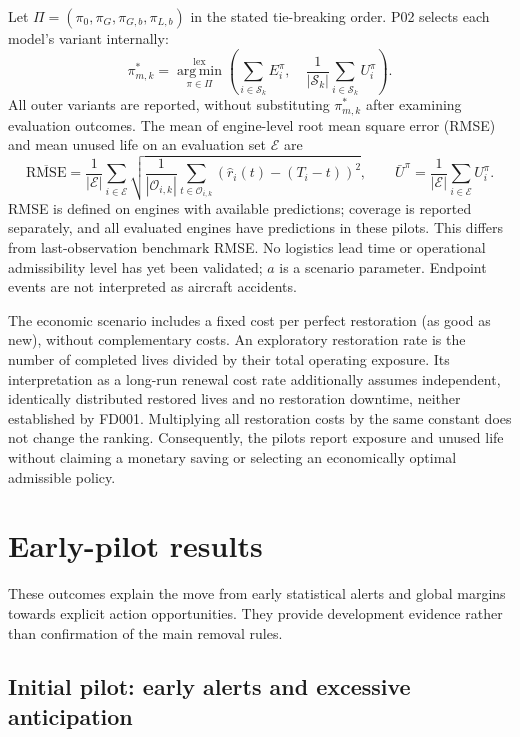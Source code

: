 \documentclass[12pt]{article}
\begin{document}
Let $\Pi=(\pi_0,\pi_G,\pi_{G,b},\pi_{L,b})$ in the stated tie-breaking order. P02 selects each model's variant internally:
\[
\pi_{m,k}^{*}=\operatorname*{arg\,min}_{\pi\in\Pi}^{\mathrm{lex}}
\left(\sum_{i\in\mathcal S_k}E_i^{\pi},\quad
\frac1{|\mathcal S_k|}\sum_{i\in\mathcal S_k}U_i^{\pi}\right).
\]
All outer variants are reported, without substituting $\pi_{m,k}^{*}$ after examining evaluation outcomes. The mean of engine-level root mean square error (RMSE) and mean unused life on an evaluation set $\mathcal E$ are
\[
\overline{\mathrm{RMSE}}=\frac1{|\mathcal E|}\sum_{i\in\mathcal E}
\sqrt{\frac1{|\mathcal O_{i,k}|}\sum_{t\in\mathcal O_{i,k}}(\widehat r_i(t)-(T_i-t))^2},
\qquad \bar U^{\pi}=\frac1{|\mathcal E|}\sum_{i\in\mathcal E}U_i^{\pi}.
\]
RMSE is defined on engines with available predictions; coverage is reported separately, and all evaluated engines have predictions in these pilots. This differs from last-observation benchmark RMSE. No logistics lead time or operational admissibility level has yet been validated; $a$ is a scenario parameter. Endpoint events are not interpreted as aircraft accidents.

The economic scenario includes a fixed cost per perfect restoration (as good as new), without complementary costs. An exploratory restoration rate is the number of completed lives divided by their total operating exposure. Its interpretation as a long-run renewal cost rate additionally assumes independent, identically distributed restored lives and no restoration downtime, neither established by FD001. Multiplying all restoration costs by the same constant does not change the ranking. Consequently, the pilots report exposure and unused life without claiming a monetary saving or selecting an economically optimal admissible policy.

\section{Early-pilot results}\label{app:early-results}

These outcomes explain the move from early statistical alerts and global margins towards explicit action opportunities. They provide development evidence rather than confirmation of the main removal rules.

\subsection{Initial pilot: early alerts and excessive anticipation}
\end{document}
